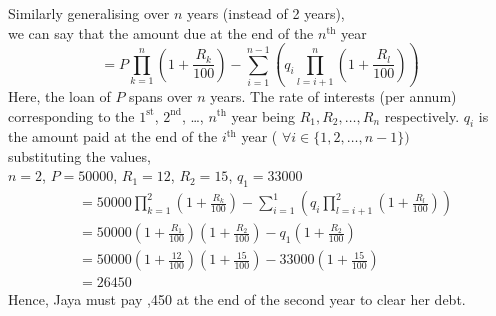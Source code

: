 \documentclass[journal,12pt,two column]{IEEEtran}
\begin{document}
\begin{enumerate}
Similarly generalising over $n$ years (instead of 2 years),\\ 
we can say that the amount due at the end of the $n^{\text{th}}$ year
\begin{equation}
 = P\prod_{k = 1}^{n}{\left(1+\frac{R_k}{100}\right)} - \sum_{i=1}^{n-1}{\left(q_i\prod_{l=i+1}^{n}{\left(1+\frac{R_l}{100}\right)}\right)}
\end{equation}
%
Here,
 the loan of \rupee$P$ spans over $n$ years. The rate of interests (per annum) corresponding to the $1^\text{st}$, $2^\text{nd}$, \ldots, $n^\text{th}$ year being $R_1, R_2, \ldots, R_n$  respectively. \rupee$q_i$ is the amount paid at the end of the  $i^\text{th}$ year ( $\forall i\in \{1,2,\ldots,n-1\})$\\
substituting the values,\\
$n = 2$, $P = 50000$, $R_1=12$, $R_2=15$, $q_1 = 33000$
\begin{align*}
     &= 50000 \prod_{k = 1}^{2}  {\left(  1+\frac{R_k}{100}     \right)} - \sum_{i=1}^{1}{\left(q_i\prod_{l=i+1}^{2}{\left(1+\frac{R_l}{100}\right)}\right)}
     \\
     &=50000\left(1+\frac{R_1}{100}\right)\left(1+\frac{R_2}{100}\right) - 
    q_1\left(1+\frac{R_2}{100}\right)
    \\
     &=50000\left(1+\frac{12}{100}\right)\left(1+\frac{15}{100}\right) - 
    33000\left(1+\frac{15}{100}\right)
    \\
    &=26450
\end{align*}
Hence, Jaya must pay ,450 at the end of the second year to clear her debt.
\end{enumerate}
\end{document}
